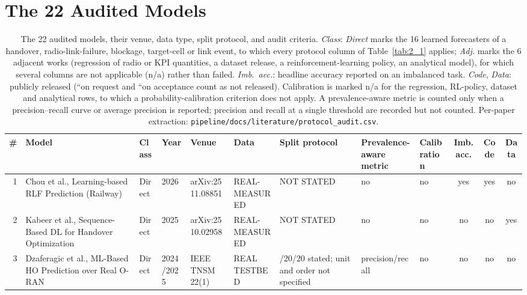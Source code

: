 \chapter{The 22 Audited Models}\label{app:D}


\begin{table}
\centering
\caption{The 22 audited models, their venue, data type, split protocol, and audit criteria. \emph{Class}: \emph{Direct} marks the 16 learned forecasters of a handover, radio-link-failure, blockage, target-cell or link event, to which every protocol column of Table~\ref{tab:2_1} applies; \emph{Adj.} marks the 6 adjacent works (regression of radio or KPI quantities, a dataset release, a reinforcement-learning policy, an analytical model), for which several columns are not applicable (n/a) rather than failed. \emph{Imb.\ acc.}: headline accuracy reported on an imbalanced task. \emph{Code}, \emph{Data}: publicly released (``on request and ``on acceptance count as not released). Calibration is marked n/a for the regression, RL-policy, dataset and analytical rows, to which a probability-calibration criterion does not apply. A prevalence-aware metric is counted only when a precision--recall curve or average precision is reported; precision and recall at a single threshold are recorded but not counted. Per-paper extraction: \texttt{pipeline/docs/literature/protocol\_audit.csv}.}
\label{tab:D_1}
\vspace{0.4em}
\singlespacing
\scriptsize
\setlength{\tabcolsep}{3pt}
\begin{tabularx}{\linewidth}{r >{\raggedright\arraybackslash}p{3.9cm} >{\raggedright\arraybackslash}p{1.4cm} l >{\raggedright\arraybackslash}p{2.7cm} >{\raggedright\arraybackslash}p{2.4cm} >{\raggedright\arraybackslash}X >{\raggedright\arraybackslash}p{1.7cm} >{\raggedright\arraybackslash}p{1.7cm} c c c}
\toprule
\textbf{\#} & \textbf{Model} & \textbf{Class} & \textbf{Year} & \textbf{Venue} & \textbf{Data} & \textbf{Split protocol} & \textbf{Prevalence-aware metric} & \textbf{Calibration} & \textbf{Imb. acc.} & \textbf{Code} & \textbf{Data} \\
\midrule
1 & Chou et al., Learning-based RLF Prediction (Railway) & Direct & 2026 & arXiv:2511.08851 \cite{ref57} & REAL-MEASURED & NOT STATED & no & no & yes & yes & no \\
2 & Kabeer et al., Sequence-Based DL for Handover Optimization & Direct & 2025 & arXiv:2510.02958 \cite{ref45} & REAL-MEASURED & NOT STATED & no & no & no & no & yes \\
3 & Dzaferagic et al., ML-Based HO Prediction over Real O-RAN & Direct & 2024/2025 & IEEE TNSM 22(1) \cite{ref54} & REAL TESTBED & 60/20/20 stated; unit and order not specified & precision/recall & no & no & no & no \\

\end{tabularx}
\end{table}
